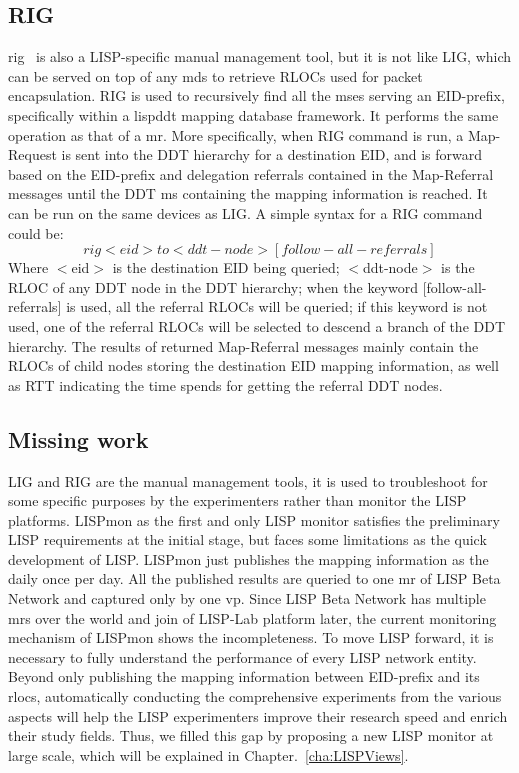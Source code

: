 \subsection{RIG}
\label{subsec:monitor_rig}
\acrfull{rig}~\cite{rfc8112} is also a LISP-specific manual management tool, but it is not like LIG, which can be served on top of any \acrshort{mds} to retrieve RLOCs used for packet encapsulation. RIG is used to recursively find all the \acrshort{ms}es serving an EID-prefix, specifically within a \acrshort{lispddt} mapping database framework. It performs the same operation as that of a \acrshort{mr}. More specifically, when RIG command is run, a Map-Request is sent into the DDT hierarchy for a destination EID, and is forward based on the EID-prefix and delegation referrals contained in the Map-Referral messages until the DDT \acrshort{ms} containing the mapping information is reached. It can be run on the same devices as LIG. A simple syntax for a RIG command could be:
\begin{equation}
rig <eid> to <ddt-node> [follow-all-referrals] \nonumber
\end{equation}
Where $<$eid$>$ is the destination EID being queried; $<$ddt-node$>$ is the RLOC of any DDT node in the DDT hierarchy; when the keyword $[$follow-all-referrals$]$ is used, all the referral RLOCs will be queried; if this keyword is not used, one of the referral RLOCs will be selected to descend a branch of the DDT hierarchy. The results of returned Map-Referral messages mainly contain the RLOCs of child nodes storing the destination EID mapping information, as well as RTT indicating the time spends for getting the referral DDT nodes.

\subsection{Missing work}
\label{subsec:monitor_missing}
LIG and RIG are the manual management tools, it is used to troubleshoot for some specific purposes by the experimenters rather than monitor the LISP platforms. LISPmon as the first and only LISP monitor satisfies the preliminary LISP requirements at the initial stage, but faces some limitations as the quick development of LISP. LISPmon just publishes the mapping information as the daily once per day. All the published results are queried to one \acrshort{mr} of LISP Beta Network and captured only by one \acrshort{vp}. Since LISP Beta Network has multiple \acrshort{mr}s over the world and join of LISP-Lab platform later, the current monitoring mechanism of LISPmon shows the incompleteness. To move LISP forward, it is necessary to fully understand the performance of every LISP network entity. Beyond only publishing the mapping information between EID-prefix and its \acrshort{rloc}s, automatically conducting the comprehensive experiments from the various aspects will help the LISP experimenters improve their research speed and enrich their study fields. Thus, we filled this gap by proposing a new LISP monitor at large scale, which will be explained in Chapter.~\ref{cha:LISPViews}.


